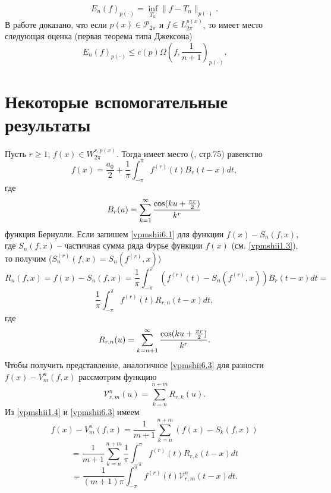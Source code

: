 \begin{equation}\label{vpmshii5.8}
    E_n(f)_{p(\cdot)}=\inf_{T_n}\|f-T_n\|_{p(\cdot)}.
\end{equation}
 В работе \cite{vpmshiiShar6} доказано, что если $p(x)\in\mathcal{ P}_{2\pi}$ и $f\in L_{2\pi}^{p(x)} $, то имеет место следующая оценка (первая теорема типа Джексона)
\begin{equation}\label{vpmshii5.9}
    E_n(f)_{p(\cdot)}\le c(p)\Omega(f,\frac{1}{n+1})_{p(\cdot)}.
\end{equation}


\section{Некоторые вспомогательные результаты}\label{vpmshiis6}

Пусть $r\ge1$, $f(x)\in W_{2\pi}^{r,p(x)} $. Тогда имеет место (\cite{Zigmund1}, стр.75) равенство
\begin{equation}\label{vpmshii6.1}
    f(x)=\frac{a_0}{2}+ \frac{1}{\pi}\int_{-\pi}^\pi f^{(r)}(t)B_r(t-x)dt,
\end{equation}
где
\begin{equation}\label{vpmshii6.2}
    B_r(u)=\sum_{k=1}^\infty {\cos(ku+\frac{\pi r}{2})\over k^r}
\end{equation}
функция Бернулли. Если запишем \eqref{vpmshii6.1} для функции $f(x)-S_n(f,x)$, где $S_n(f,x)$ -- частичная сумма ряда Фурье функции $f(x)$ (см. \eqref{vpmshii1.3}), то получим ($S_n^{(r)}(f,x)=S_n(f^{(r)},x)$)
$$
R_n(f,x)=f(x)-S_n(f,x)=\frac{1}{\pi}\int_{-\pi}^\pi( f^{(r)}(t)-S_n(f^{(r)},x))B_r(t-x)dt=
$$
\begin{equation}\label{vpmshii6.3}
    \frac{1}{\pi}\int_{-\pi}^\pi f^{(r)}(t)R_{r,n}(t-x)dt,
\end{equation}
где
\begin{equation}\label{vpmshii6.4}
     R_{r,n}(u)=\sum_{k=n+1}^\infty {\cos(ku+\frac{\pi r}{2})\over k^r}.
\end{equation}
Чтобы получить представление, аналогичное \eqref{vpmshii6.3} для разности $f(x)-V_m^n(f,x)$ рассмотрим функцию
\begin{equation}\label{vpmshii6.5}
    \mathcal{ V}_{r,m}^n(u)=\sum_{k=n}^{n+m}R_{r,k}(u).
\end{equation}
Из \eqref{vpmshii1.4} и \eqref{vpmshii6.3} имеем
$$
f(x)-V_m^n(f,x)=\frac{1}{m+1}\sum_{k=n}^{n+m}(f(x)-S_k(f,x))
$$
$$
=\frac{1}{m+1}\sum_{k=n}^{n+m}\frac{1}{\pi}\int_{-\pi}^\pi f^{(r)}(t)R_{r,k}(t-x)dt
$$
\begin{equation}\label{vpmshii6.6}
    =\frac{1}{(m+1)\pi}\int_{-\pi}^\pi f^{(r)}(t)\mathcal{ V}_{r,m}^n(t-x)dt.
\end{equation}
